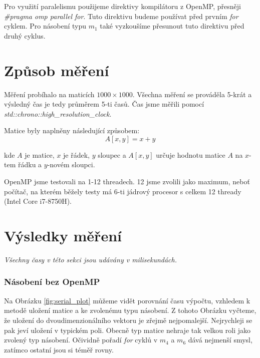 \documentclass[a4paper, 12pt]{article}
\begin{document}


Pro využití paralelismu použijeme direktivy kompilátoru z OpenMP, přesněji \emph{\#pragma omp parallel for}. Tuto direktivu budeme používat před prvním \emph{for} cyklem. Pro násobení typu $m_1$ také vyzkoušíme přesunout tuto direktivu před druhý cyklus.

\newpage
\section{Způsob měření}

Měření probíhalo na maticích $ 1000 \times 1000 $. Všechna měření se prováděla 5-krát a výsledný čas je tedy průměrem 5-ti časů. Čas jsme měřili pomocí \emph{std::chrono::high\_resolution\_clock}. 

Matice byly naplněny následující způsobem:
\begin{equation}
 A[x,y] = x + y
\end{equation}

\noindent kde $A$ je matice, $x$ je řádek, $y$ sloupec a $A[x,y]$ určuje hodnotu matice $A$ na $x$-tem řádku a $y$-novém sloupci.

OpenMP jsme testovali na 1-12 threadech. 12 jsme zvolili jako maximum, neboť počítač, na kterém běžely testy má 6-ti jádrový procesor s celkem 12 thready (Intel Core i7-8750H).

\section{Výsledky měření}
\textit{Všechny časy v této sekci jsou udávány v milisekundách.}
\subsubsection{Násobení bez OpenMP}

Na Obrázku \ref{fig:serial_plot} můžeme vidět porovnání času výpočtu, vzhledem k metodě uložení matice a ke zvolenému typu násobení. Z tohoto Obrázku vyčteme, že uložení do dvoudimenzionálního vektoru je zřejmě nejpomalejší. Nejrychleji se pak jeví uložení v typickém poli. Obecně typ matice nehraje tak velkou roli jako zvolený typ násobení. Očividně  pořadí \emph{for} cyklů v $m_4$ a $m_6$ dává nejmenší smysl, zatímco ostatní jsou si téměř rovny.
\end{document}
